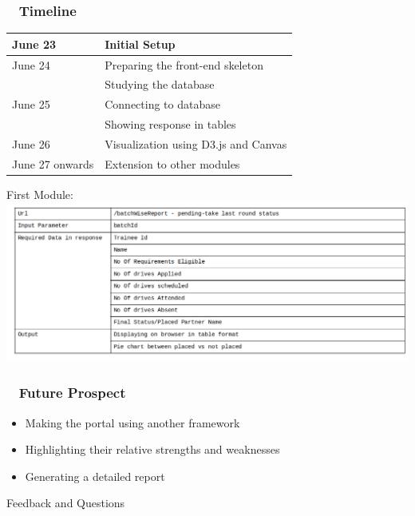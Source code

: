 \documentclass{beamer}
\begin{document}
\begin{frame}
\frametitle{~ Timeline}
\begin{center}

\begin{tabular}{|l|l|}
     \hline
     June 23 & Initial Setup\\
     \hline
     June 24 & Preparing the front-end skeleton\\
     \hline & Studying the database\\
     \hline
     June 25 & Connecting to database\\
     \hline & Showing response in tables\\
     \hline
     June 26 & Visualization using D3.js and Canvas\\
     \hline
     June 27 onwards & Extension to other modules\\
     \hline
     
\end{tabular}
\end{center}    
\end{frame}

\begin{frame}
\centering
First Module:
\includegraphics[width = 15cm]{First Module.png}
\end{frame}

\begin{frame}
\frametitle{ ~ Future Prospect} 
\begin{itemize}
\item{Making the portal using another framework}
\item{Highlighting their relative strengths and weaknesses}
\item{Generating a detailed report}
\end{itemize}
\end{frame}



\begin{frame}
\Huge{Feedback and Questions}
\end{frame}

\end{document}
